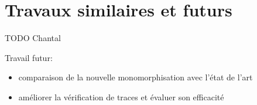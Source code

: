 \section{Travaux similaires et futurs}

TODO Chantal

Travail futur:
\begin{itemize}
\item comparaison de la nouvelle monomorphisation avec l'état de l'art
\item améliorer la vérification de traces et évaluer son efficacité
\end{itemize}
